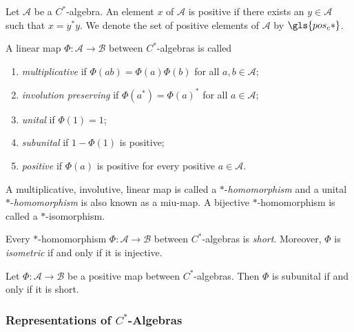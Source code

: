 \begin{definition}
  Let $ \mathscr{A}$ be a \( C^* \)-algebra. An element $x$ of $ \mathscr{A}$ is  positive if there exists an $y \in  \mathscr{A}$ such that $x = y^* y$.
  We denote the set of positive elements of $ \mathscr{A}$ by $ \gls{pos_c*}$.
\end{definition}


\begin{definition}
 A linear map $\Phi: \mathscr{A} \to \mathscr{B}$ between $C^*$-algebras is called
\begin{enumerate}
    \item \emph{multiplicative} if $\Phi(ab) = \Phi(a)\Phi(b)$ for all $a, b \in \mathscr{A} $;
    \item \emph{involution preserving} if $\Phi(a^*) = \Phi(a)^*$ for all $a \in \mathscr{A} $;
    \item \emph{unital} if $\Phi(1) = 1$;
    \item \emph{subunital} if $1-\Phi(1)$ is positive;
    \item \emph{positive} if $\Phi(a)$ is positive for every positive $a \in \mathscr{A} $.
\end{enumerate}
A multiplicative, involutive, linear map is called a \(*\)-\emph{homomorphism} and a unital \(*\)-\emph{homomorphism} is also known as a \acrshort{miu}-map. A bijective \(*\)-homomorphism is called a \(*\)-isomorphism.
\end{definition}

\begin{proposition} \cite[Theorem 1.5.7]{pedersenCalgebrasTheirAutomorphism1979} \label{prop:HomShortIsoIso}
  Every \(*\)-homomorphism \( \Phi: \mathscr{A} \to \mathscr{B} \) between \( C^* \)-algebras is \emph{short}. Moreover, \( \Phi \) is \emph{isometric} if and only if it is injective.
\end{proposition}

\begin{proposition} \cite[Proposition 2.4]{choSemanticsQuantumProgramming2016} \label{prop:subunital_short}
Let \( \Phi: \mathscr{A} \to \mathscr{B} \) be a positive map between \( C^* \)-algebras. Then \( \Phi \) is subunital if and only if it is short.
\end{proposition}


\subsubsection{Representations of $C^*$-Algebras}

